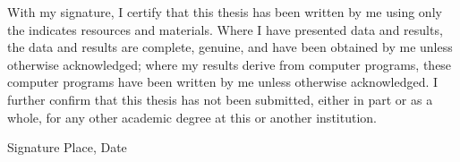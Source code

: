   \newpage
  \thispagestyle{empty}

  With my signature, I certify that this thesis has been written by me
  using only the indicates resources and materials. Where I have
  presented data and results, the data and results are complete,
  genuine, and have been obtained by me unless otherwise acknowledged;
  where my results derive from computer programs, these computer
  programs have been written by me unless otherwise acknowledged. I
  further confirm that this thesis has not been submitted, either in
  part or as a whole, for any other academic degree at this or another
  institution.

  \vspace{20mm}

  Signature \hfill Place, Date

  \newpage

  

  \newpage
  \tableofcontents

  \clearpage
